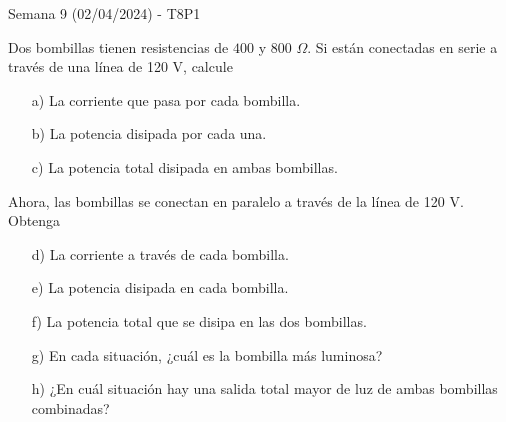 \begin{frame}{Semana 9 (02/04/2024) - T8P1}
    
    Dos bombillas tienen
resistencias de $400$ y $800$ $\Omega$. Si están conectadas en serie a través 
de una línea de 120 V, calcule 
    
    \begin{itemize}
        \item[a)] La corriente que pasa por cada bombilla.
        \item[b)] La potencia disipada por cada una.
        \item[c)] La potencia total disipada
en ambas bombillas.
    \end{itemize}

    Ahora, las bombillas se conectan en paralelo a
través de la línea de 120 V. Obtenga

    \begin{itemize}
        \item[d)] La corriente a través de cada
bombilla.
        \item[e)] La potencia disipada en cada bombilla.
        \item[f)] La potencia total
que se disipa en las dos bombillas.
        \item[g)] En cada situación, ¿cuál es la
bombilla más luminosa?
        \item[h)] ¿En cuál situación hay una salida total
mayor de luz de ambas bombillas combinadas?
    \end{itemize}
    
\end{frame}

